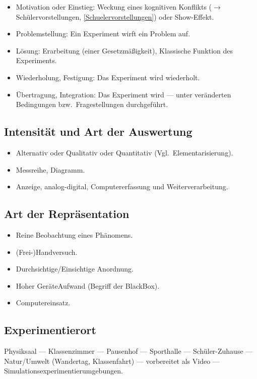\begin{itemize}
	\item
	Motivation oder Einstieg: Weckung eines kognitiven Konflikts ($\to$ Schülervorstellungen, \cref{Schuelervorstellungen})
	oder Show-Effekt.
	\item
	Problemstellung: Ein Experiment wirft ein Problem auf.
	\item
	L\"{o}sung: Erarbeitung (einer Gesetzm\"{a}{\ss}igkeit),
	Klassische Funktion des Experiments.
	
	\item
	Wiederholung, Festigung: Das Experiment wird wiederholt.
	
	\item
	\"{U}bertragung, Integration: Das Experiment wird --- unter ver\"{a}nderten
	Bedingungen bzw.\ Fragestellungen durchgef\"{u}hrt.
\end{itemize}

\subsection{Intensit\"{a}t und Art der Auswertung}
\begin{itemize}
	\item
	Alternativ oder
	Qualitativ oder Quantitativ (Vgl.\ Elementarisierung).
	\item
	Messreihe, Diagramm.
	\item
	Anzeige, analog-digital, Computererfassung und Weiterverarbeitung.
\end{itemize}

\subsection{Art der Repr\"{a}sentation}
\begin{itemize}
	\item
	Reine Beobachtung eines Ph\"{a}nomens.
	\item
	(Frei-)Handversuch.
	\item
	Durchsichtige/Einsichtige Anordnung.
	\item
	Hoher Ger\"{a}teAufwand (Begriff der BlackBox).
	\item
	Computereinsatz.
\end{itemize}

\subsection{Experimentierort}
Physiksaal --- Klassenzimmer --- Pausenhof --- Sporthalle
 --- Sch\"{u}ler-Zuhause --- Natur/Umwelt (Wandertag, Klassenfahrt) --- vorbereitet als Video --- Simulationsexperimentierumgebungen.

